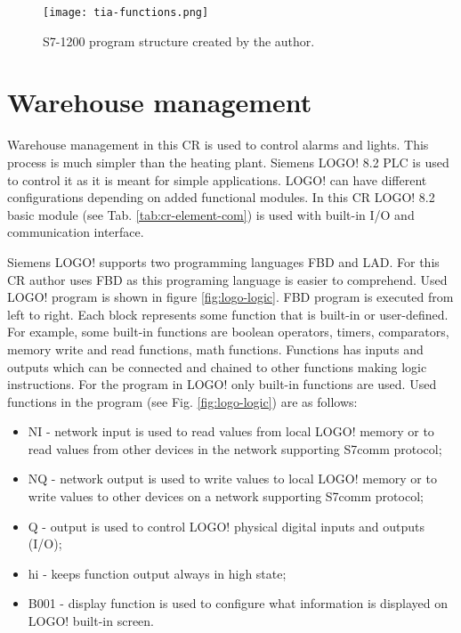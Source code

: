 \begin{figure}[htb]
	\centering
	\texttt{[image: tia-functions.png]}
	\caption{S7-1200 program structure created by the author.}
	\label{fig:tia-functions}
\end{figure}


\section{Warehouse management} \label{sec:warehouse-managment}

Warehouse management in this CR is used to control alarms and lights. This process is much simpler than the heating plant. Siemens LOGO! 8.2 PLC is used to control it as it is meant for simple applications. LOGO! can have different configurations depending on added functional modules. In this CR LOGO! 8.2 basic module (see Tab. \ref{tab:cr-element-com}) is used with built-in I/O and communication interface.

Siemens LOGO! supports two programming languages FBD and LAD. For this CR author uses FBD as this programing language is easier to comprehend. Used LOGO! program is shown in figure \ref{fig:logo-logic}. FBD program is executed from left to right. Each block represents some function that is built-in or user-defined. For example, some built-in functions are boolean operators, timers, comparators, memory write and read functions, math functions. Functions has inputs and outputs which can be connected and chained to other functions making logic instructions. For the program in LOGO! only built-in functions are used. Used functions in the program (see Fig. \ref{fig:logo-logic}) are as follows:

\begin{itemize}
	\item NI - network input is used to read values from local LOGO! memory or to read values from other devices in the network supporting S7comm protocol;
	\item NQ - network output is used to write values to local LOGO! memory or to write values to other devices on a network supporting S7comm protocol;
	\item Q - output is used to control LOGO! physical digital inputs and outputs (I/O);
	\item hi - keeps function output always in high state;
	\item B001 - display function is used to configure what information is displayed on LOGO! built-in screen.
\end{itemize}

